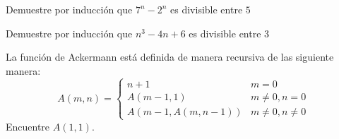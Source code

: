 	\begin{exmp}
		Demuestre por inducción que 		
		$7^{n}-2^{n}$ es divisible entre $5$
	\end{exmp}



	\begin{exmp}
		Demuestre por inducción que 		
		$n^{3}-4n+6$ es divisible entre $3$
	\end{exmp}



	\begin{exmp}
		La funci\'on de Ackermann est\'a definida de manera recursiva de las siguiente manera:
		$$
		A(m,n)=
		\begin{cases}
			n+1 & m=0\\
			A(m-1,1) & m\neq0, n=0 \\
			A(m-1, A(m,n-1)) & m\neq 0, n\neq 0
		\end{cases}
		$$
		Encuentre $A(1,1)$.		
	\end{exmp}
	

